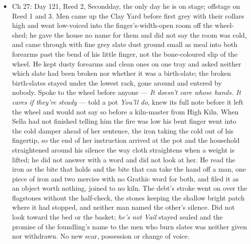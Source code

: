 \documentclass{design/chronicle}
\begin{document}
{\begin{itemize}[leftmargin=1.4em,itemsep=1pt,topsep=3pt,parsep=0pt]
\item Ch 27: Day 121, Reed 2, Secondday, the only day he is on stage; offstage on Reed 1 and 3. Men came up the Clay Yard before first grey with their collars high and went low-voiced into the finger’s-width-open room off the wheel-shed; he gave the house no name for them and did not say the room was cold, and came through with fine grey slate dust ground small as meal into both forearms past the bend of his little finger, not the bone-coloured slip of the wheel. He kept dusty forearms and clean ones on one tray and asked neither which slate had been broken nor whether it was a birth-slate; the broken birth-slates stayed under the lowest rack, gone around and entered by nobody. Spoke to the wheel before anyone — \emph{It doesn’t care whose hands. It cares if they’re steady} — told a pot \emph{You’ll do}, knew its full note before it left the wheel and would not say so before a kiln-master from High Kiln. When Sella had not finished telling him the fire was low his bent finger went into the cold damper ahead of her sentence, the iron taking the cold out of his fingertip, so the end of her instruction arrived at the pot and the household straightened around his silence the way cloth straightens when a weight is lifted; he did not answer with a word and did not look at her. He read the iron as the bite that holds and the bite that can take the hand off a man, one piece of iron and two mercies with no Grathic word for both, and filed it as an object worth nothing, joined to no kiln. The debt’s stroke went on over the flagstones without the half-check, the stones keeping the shallow bright patch where it had stopped, and neither man named the other’s silence. Did not look toward the bed or the basket; \emph{he’s not Vail} stayed sealed and the promise of the foundling’s name to the men who burn slates was neither given nor withdrawn. No new scar, possession or change of voice.

\end{itemize}

\begin{itemize}[leftmargin=1.4em,itemsep=1pt,topsep=3pt,parsep=0pt]


\end{itemize}}
\end{document}
